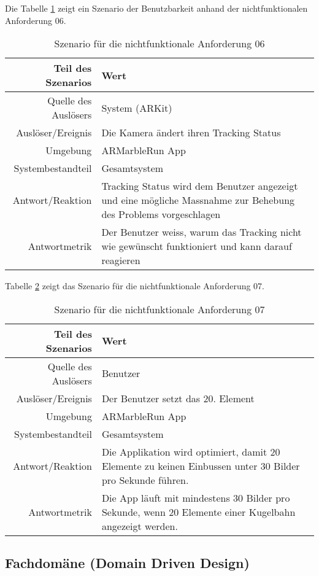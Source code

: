 Die Tabelle \ref{tab:szenario-nfa-06} zeigt ein Szenario der Benutzbarkeit anhand der nichtfunktionalen Anforderung 06.
\begin{table}
	\begin{tabular}{r p{12cm}}
		\hline
		Teil des Szenarios & Wert \\
		\hline
		Quelle des Auslösers & System (ARKit) \\
		Auslöser/Ereignis & Die Kamera ändert ihren Tracking Status \\
		Umgebung & ARMarbleRun App \\
		Systembestandteil & Gesamtsystem \\
		Antwort/Reaktion & Tracking Status wird dem Benutzer angezeigt und eine mögliche Massnahme zur Behebung des Problems vorgeschlagen \\
		Antwortmetrik & Der Benutzer weiss, warum das Tracking nicht wie gewünscht funktioniert und kann darauf reagieren \\
		\hline
	\end{tabular}
	\caption{Szenario für die nichtfunktionale Anforderung 06}
	\label{tab:szenario-nfa-06}
\end{table}

Tabelle \ref{tab:szenario-nfa-07} zeigt das Szenario für die nichtfunktionale Anforderung 07.

\begin{table}
	\begin{tabular}{r p{12cm}}
		\hline
		Teil des Szenarios & Wert \\
		\hline
		Quelle des Auslösers & Benutzer \\
		Auslöser/Ereignis & Der Benutzer setzt das 20. Element \\
		Umgebung & ARMarbleRun App \\
		Systembestandteil & Gesamtsystem \\
		Antwort/Reaktion & Die Applikation wird optimiert, damit 20 Elemente zu keinen Einbussen unter 30 Bilder pro Sekunde führen. \\
		Antwortmetrik & Die App läuft mit mindestens 30 Bilder pro Sekunde, wenn 20 Elemente einer Kugelbahn angezeigt werden. \\
		\hline
	\end{tabular}
	\caption{Szenario für die nichtfunktionale Anforderung 07}
	\label{tab:szenario-nfa-07}
\end{table}

\subsection{Fachdomäne (Domain Driven Design)}

